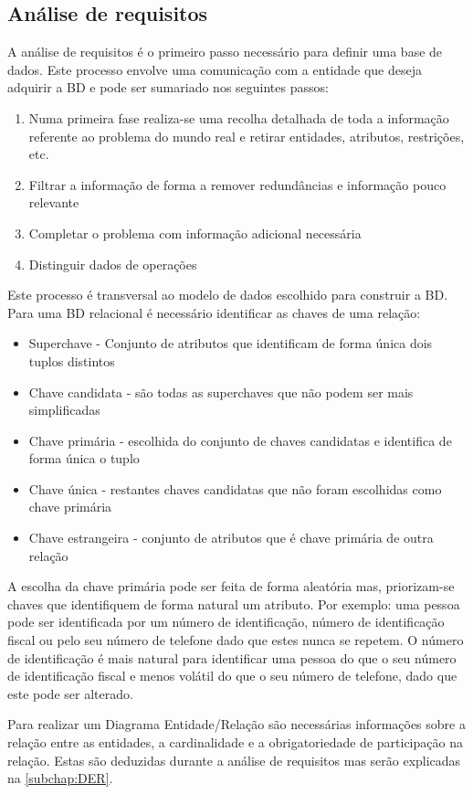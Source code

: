 \documentclass[11pt,twoside,a4paper]{report}
\begin{document}
\subsection{Análise de requisitos}
A análise de requisitos é o primeiro passo necessário para definir uma base de dados. Este processo envolve uma comunicação com a entidade que deseja adquirir a BD e pode ser sumariado nos seguintes passos:
\begin{enumerate}
	\item Numa primeira fase realiza-se uma recolha detalhada de toda a informação referente ao problema do mundo real e retirar entidades, atributos, restrições, etc.
	\item Filtrar a informação de forma a remover redundâncias e informação pouco relevante
	\item Completar o problema com informação adicional necessária
	\item Distinguir dados de operações
\end{enumerate}
Este processo é transversal ao modelo de dados escolhido para construir a BD. Para uma BD relacional é necessário identificar as chaves de uma relação:
\begin{itemize}
	\item Superchave - Conjunto de atributos que identificam de forma única dois tuplos distintos
	\item Chave candidata - são todas as superchaves que não podem ser mais simplificadas
	\item Chave primária - escolhida do conjunto de chaves candidatas e identifica de forma única o tuplo
	\item Chave única - restantes chaves candidatas que não foram escolhidas como chave primária
	\item Chave estrangeira - conjunto de atributos que é chave primária de outra relação
\end{itemize}
A escolha da chave primária pode ser feita de forma aleatória mas, priorizam-se chaves que identifiquem de forma natural um atributo. Por exemplo: uma pessoa pode ser identificada por um número de identificação, número de identificação fiscal ou pelo seu número de telefone dado que estes nunca se repetem. O número de identificação é mais natural para identificar uma pessoa do que o seu número de identificação fiscal e menos volátil do que o seu número de telefone, dado que este pode ser alterado.\par 
Para realizar um Diagrama Entidade/Relação são necessárias informações sobre a relação entre as entidades, a cardinalidade e a obrigatoriedade de participação na relação. Estas são deduzidas durante a análise de requisitos mas serão explicadas na \autoref{subchap:DER}.
\end{document}
